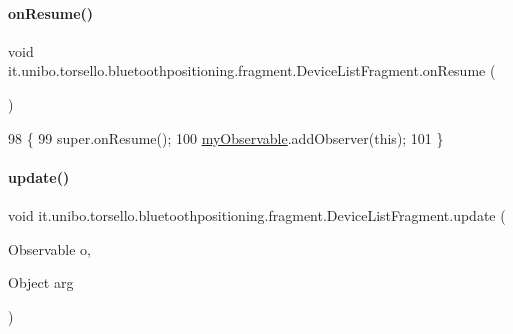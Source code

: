 \paragraph{\texorpdfstring{on\+Resume()}{onResume()}}
{\footnotesize\ttfamily void it.\+unibo.\+torsello.\+bluetoothpositioning.\+fragment.\+Device\+List\+Fragment.\+on\+Resume (\begin{DoxyParamCaption}{ }\end{DoxyParamCaption})}


\begin{DoxyCode}
98                            \{
99         super.onResume();
100         \hyperlink{classit_1_1unibo_1_1torsello_1_1bluetoothpositioning_1_1fragment_1_1DeviceListFragment_a6a78ac6c8b7bc5b91a5966c341305b62_a6a78ac6c8b7bc5b91a5966c341305b62}{myObservable}.addObserver(\textcolor{keyword}{this});
101     \}
\end{DoxyCode}
\hypertarget{classit_1_1unibo_1_1torsello_1_1bluetoothpositioning_1_1fragment_1_1DeviceListFragment_a5c8153bcb9d24c048d8f605f8f280557_a5c8153bcb9d24c048d8f605f8f280557}{}\label{classit_1_1unibo_1_1torsello_1_1bluetoothpositioning_1_1fragment_1_1DeviceListFragment_a5c8153bcb9d24c048d8f605f8f280557_a5c8153bcb9d24c048d8f605f8f280557} 
\paragraph{\texorpdfstring{update()}{update()}}
{\footnotesize\ttfamily void it.\+unibo.\+torsello.\+bluetoothpositioning.\+fragment.\+Device\+List\+Fragment.\+update (\begin{DoxyParamCaption}\item[{Observable}]{o,  }\item[{Object}]{arg }\end{DoxyParamCaption})}


